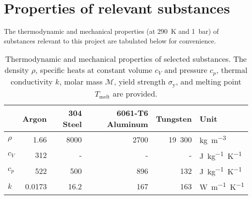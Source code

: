 \chapter{Properties of relevant substances} \label{chp:app_matprops}
\begin{refsection}

    The thermodynamic and mechanical properties (at \qty{290}{K} and \qty{1}{bar}) of substances relevant to this project are tabulated below for convenience. 

    \begin{table}[h]
        \centering
        \caption[Thermodynamic and mechanical properties of selected substances]{Thermodynamic and mechanical properties of selected substances. The density $\rho$, specific heats at constant volume $c_V$ and pressure $c_p$, thermal conductivity $k$, molar mass $\mathcal{M}$, yield strength $\sigma_\mathrm{y}$, and melting point $T_\mathrm{melt}$ are provided.}
        \label{tab:matprops}
        \begin{tabular}{@{}lrrrrl@{}}
            \toprule
                                & Argon                                          & 304 Steel                      & 6061-T6 Aluminum                                      & Tungsten                                                                       & Unit                      \\
            \midrule
            $\rho$              & 1.66                                           & 8000                           & 2700                                                  & 19~300                                                                          & \unit{kg.m^{-3}}           \\
            $c_V$               & 312                                            & -                               & -                                                      & -                                                                               & \unit{J.kg^{-1}.K^{-1}} \\
            $c_p$               & 522                                            & 500                            & 896                                                   & 132                                                                            & \unit{J.kg^{-1}.K^{-1}} \\
            $k$                 & 0.0173                                         & 16.2                           & 167                                                   & 163                                                                            & \unit{W.m^{-1}.K^{-1}}  \\

\end{tabular}
\end{table}
\end{refsection}
